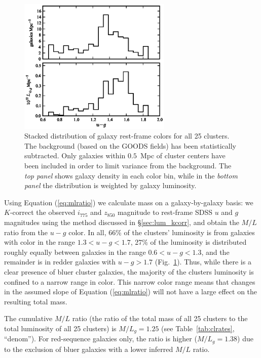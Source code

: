 \begin{figure}
\includegraphics[width=0.65\textwidth]{figures/clrate/colorhist.eps}
\caption[Distribution of cluster galaxy rest-frame colors]
{Stacked distribution of galaxy rest-frame colors for all 
25 clusters. The background (based on the GOODS fields) has been
statistically subtracted. Only galaxies within $0.5$~Mpc of cluster
centers have been included in order to limit variance from the
background. The \emph{top panel} shows galaxy density in each color bin,
while in the \emph{bottom panel} the distribution is weighted by galaxy
luminosity.
\label{fig:colorhist}}
\end{figure}

Using Equation (\ref{eq:mlratio}) we calculate mass on a
galaxy-by-galaxy basis: we $K$-correct the observed $i_{775}$ and
$z_{850}$ magnitude to rest-frame SDSS $u$ and $g$ magnitudes using
the method discussed in \S\ref{sec:lum_kcorr}, and obtain the $M/L$
ratio from the $u-g$ color. In all, 66\% of the clusters'
luminosity is from galaxies with color in the range $1.3 < u-g < 1.7$,
27\% of the luminosity is distributed roughly equally between galaxies
in the range $0.6 < u-g < 1.3$, and the remainder is in redder
galaxies with $u-g > 1.7$ (Fig.~\ref{fig:colorhist}). Thus, while there is a clear presence of
bluer cluster galaxies, the majority of the clusters luminosity is
confined to a narrow range in color. This narrow color range means
that changes in the assumed slope of Equation (\ref{eq:mlratio}) will
not have a large effect on the resulting total mass.

The cumulative $M/L$ ratio (the ratio of the total mass of all 25
clusters to the total luminosity of all 25 clusters) is $M/L_g = 1.25$
(see Table~\ref{tab:clrates}, ``denom''). For red-sequence galaxies
only, the ratio is higher ($M/L_g = 1.38$) due to the exclusion of
bluer galaxies with a lower inferred $M/L$ ratio.

